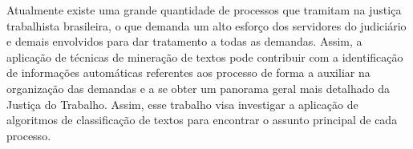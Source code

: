 Atualmente existe uma grande quantidade de processos que tramitam na justiça trabalhista brasileira, o que demanda um alto esforço dos servidores do judiciário e demais envolvidos para dar tratamento a todas as demandas. Assim, a aplicação de técnicas de mineração de textos pode contribuir com a identificação de informações automáticas referentes aos processo de forma a auxiliar na organização das demandas e a se obter um panorama geral mais detalhado da Justiça do Trabalho. Assim, esse trabalho visa investigar a aplicação de algoritmos de classificação de textos para encontrar o assunto principal de cada processo. 